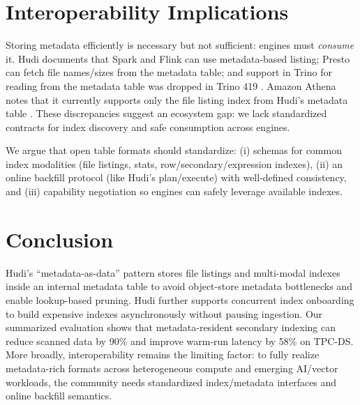 \documentclass[sigconf]{acmart}
\begin{document}
\section{Interoperability Implications}

Storing metadata efficiently is necessary but not sufficient: engines must \emph{consume} it.
Hudi documents that Spark and Flink can use metadata-based listing; Presto can fetch file names/sizes from the metadata table; and support in Trino for reading from the metadata table was dropped in Trino 419 \cite{hudi-metadata}.
Amazon Athena notes that it currently supports only the file listing index from Hudi's metadata table \cite{athena-hudi-metadata}.
These discrepancies suggest an ecosystem gap: we lack standardized contracts for index discovery and safe consumption across engines.

We argue that open table formats should standardize: (i) schemas for common index modalities (file listings, stats, row/secondary/expression indexes), (ii) an online backfill protocol (like Hudi's plan/execute) with well-defined consistency, and (iii) capability negotiation so engines can safely leverage available indexes.

\section{Conclusion}

Hudi's ``metadata-as-data'' pattern stores file listings and multi-modal indexes inside an internal metadata table to avoid object-store metadata bottlenecks and enable lookup-based pruning.
Hudi further supports concurrent index onboarding to build expensive indexes asynchronously without pausing ingestion.
Our summarized evaluation shows that metadata-resident secondary indexing can reduce scanned data by 90\% and improve warm-run latency by 58\% on TPC-DS.
More broadly, interoperability remains the limiting factor: to fully realize metadata-rich formats across heterogeneous compute and emerging AI/vector workloads, the community needs standardized index/metadata interfaces and online backfill semantics.
\end{document}
